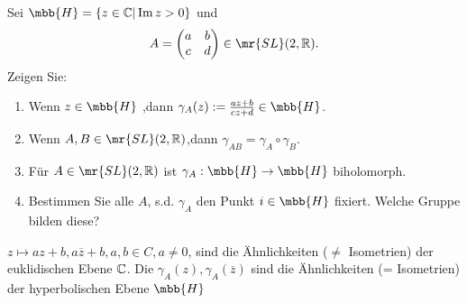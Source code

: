 \documentclass[ngerman]{report}
\begin{document}
    \begin{question}
        Sei $\mbb{H}=\{z \in \C | \Im z>0\}$ und 
        \begin{align*}
            A = \begin{pmatrix}
                a & b\\
                c & d
            \end{pmatrix}\in\mr{SL}(2,\R).
        \end{align*}
        Zeigen Sie:
        \begin{enumerate}
            \item Wenn $z\in\mbb{H}$ ,dann $\gamma_A(z):=\frac{az+b}{cz+d} \in\mbb{H}$.
            \item Wenn $A,B\in\mr{SL}(2,\R)$,dann $\gamma_{AB}=\gamma_A\circ\gamma_B$.
            \item Für $A\in\mr{SL}(2,\R)$ ist $\gamma_A:\mbb{H}\to\mbb{H}$ biholomorph.
            \item Bestimmen Sie alle $A$, s.d. $\gamma_A$ den Punkt $i \in \mbb{H}$ fixiert. Welche Gruppe bilden diese?
        \end{enumerate}
        \begin{note}
            $z \mapsto az +b,a\overline{z} +b, a,b \in C,a \neq 0$, sind die Ähnlichkeiten ($\neq$ Isometrien) der euklidischen Ebene $\mathbb{C}$. Die $\gamma_A(z),\gamma_A(\overline{z})$ sind die Ähnlichkeiten (= Isometrien) der hyperbolischen Ebene $\mbb{H}$
        \end{note}
    \end{question}
\end{document}
